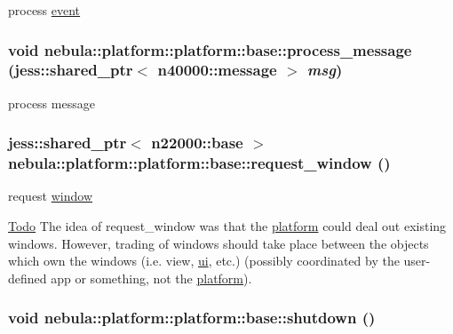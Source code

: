 process \hyperlink{structnebula_1_1platform_1_1platform_1_1base_1_1event}{event} \hypertarget{classnebula_1_1platform_1_1platform_1_1base_a0e70c926a1d387e20ba79057065382ba}{
\subsubsection[{process\_\-message}]{\setlength{\rightskip}{0pt plus 5cm}void nebula::platform::platform::base::process\_\-message (jess::shared\_\-ptr$<$ {\bf n40000::message} $>$ {\em msg})}}
\label{classnebula_1_1platform_1_1platform_1_1base_a0e70c926a1d387e20ba79057065382ba}


process message \hypertarget{classnebula_1_1platform_1_1platform_1_1base_ad9dd0043c0e52019ed6e24a2d17b686e}{
\subsubsection[{request\_\-window}]{\setlength{\rightskip}{0pt plus 5cm}jess::shared\_\-ptr$<$ {\bf n22000::base} $>$ nebula::platform::platform::base::request\_\-window ()}}
\label{classnebula_1_1platform_1_1platform_1_1base_ad9dd0043c0e52019ed6e24a2d17b686e}


request \hyperlink{namespacenebula_1_1platform_1_1window}{window} 

\begin{Desc}
\item[\hyperlink{todo__todo000006}{Todo}]The idea of request\_\-window was that the \hyperlink{namespacenebula_1_1platform_1_1platform}{platform} could deal out existing windows. However, trading of windows should take place between the objects which own the windows (i.e. view, \hyperlink{namespacenebula_1_1ui}{ui}, etc.) (possibly coordinated by the user-\/defined app or something, not the \hyperlink{namespacenebula_1_1platform_1_1platform}{platform}). \end{Desc}
\hypertarget{classnebula_1_1platform_1_1platform_1_1base_ae2dafd0a663fdb8b95211c975c35c79a}{
\subsubsection[{shutdown}]{\setlength{\rightskip}{0pt plus 5cm}void nebula::platform::platform::base::shutdown ()}}
\label{classnebula_1_1platform_1_1platform_1_1base_ae2dafd0a663fdb8b95211c975c35c79a}


